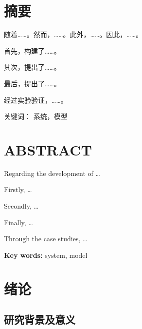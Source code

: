 \documentclass{HDU-Master-Thesis}
\begin{document}
\pagestyle{empty}




\cleardoublepage
\pagestyle{HDU-bachelor-empty}


\section*{摘\hspace{2em}要}

随着……。然而，……。此外，……。因此，……。

首先，构建了……。

其次，提出了……。

最后，提出了……。

经过实验验证，……。

\vspace{\baselineskip}\noindent
\textsf{关键词：} 系统，模型

\clearpage
\section*{\textbf{ABSTRACT}}

Regarding the development of \dots

Firstly, \dots
  
Secondly, \dots
  
Finally, \dots

Through the case studies, \dots

\vspace{\baselineskip}\noindent
\textbf{Key words:} system, model

\clearpage
\tableofcontents

\clearpage
\pagestyle{HDU-bachelor}

\section{绪论}

\subsection{研究背景及意义}
\end{document}
